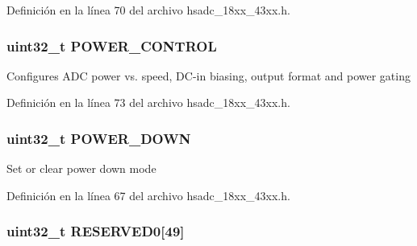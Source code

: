 Definición en la línea 70 del archivo hsadc\+\_\+18xx\+\_\+43xx.\+h.

\subsubsection[{\texorpdfstring{P\+O\+W\+E\+R\+\_\+\+C\+O\+N\+T\+R\+OL}{POWER_CONTROL}}]{ uint32\+\_\+t P\+O\+W\+E\+R\+\_\+\+C\+O\+N\+T\+R\+OL}\hypertarget{struct_l_p_c___h_s_a_d_c___t_a8f1df094209082e7487a99d38134617a}{}\label{struct_l_p_c___h_s_a_d_c___t_a8f1df094209082e7487a99d38134617a}
Configures A\+DC power vs. speed, D\+C-\/in biasing, output format and power gating 

Definición en la línea 73 del archivo hsadc\+\_\+18xx\+\_\+43xx.\+h.

\subsubsection[{\texorpdfstring{P\+O\+W\+E\+R\+\_\+\+D\+O\+WN}{POWER_DOWN}}]{ uint32\+\_\+t P\+O\+W\+E\+R\+\_\+\+D\+O\+WN}\hypertarget{struct_l_p_c___h_s_a_d_c___t_a66a06f743e4b9dd8a59503fd111e42e5}{}\label{struct_l_p_c___h_s_a_d_c___t_a66a06f743e4b9dd8a59503fd111e42e5}
Set or clear power down mode 

Definición en la línea 67 del archivo hsadc\+\_\+18xx\+\_\+43xx.\+h.

\subsubsection[{\texorpdfstring{R\+E\+S\+E\+R\+V\+E\+D0}{RESERVED0}}]{\setlength{\rightskip}{0pt plus 5cm}uint32\+\_\+t R\+E\+S\+E\+R\+V\+E\+D0\mbox{[}49\mbox{]}}\hypertarget{struct_l_p_c___h_s_a_d_c___t_a4cc7c35ca8a5a97a6a02f2d000b43dd8}{}\label{struct_l_p_c___h_s_a_d_c___t_a4cc7c35ca8a5a97a6a02f2d000b43dd8}


